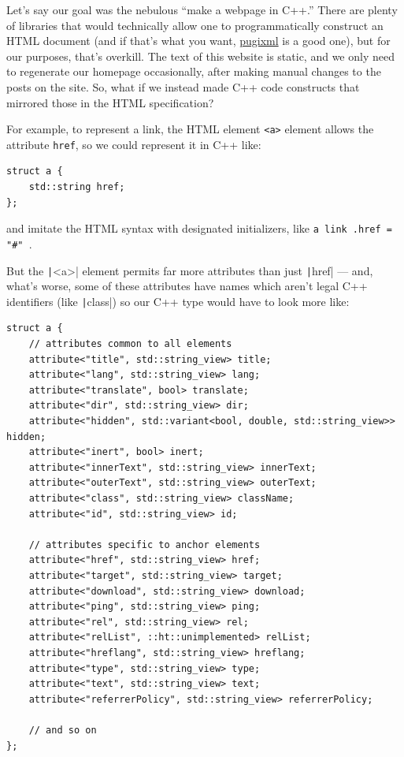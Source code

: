 \documentclass[10pt]{article}
\begin{document}
Let's say our goal was the nebulous ``make a webpage in C++.'' There are plenty of libraries that would technically allow one to programmatically construct an HTML document (and if that's what you want, \href{https://github.com/zeux/pugixml}{pugixml} is a good one), but for our purposes, that's overkill. The text of this website is static, and we only need to regenerate our homepage occasionally, after making manual changes to the posts on the site. So, what if we instead made C++ code constructs that mirrored those in the HTML specification? 

For example, to represent a link, the HTML element \verb|<a>| element allows the attribute \verb|href|, so we could represent it in C++ like: 
\begin{verbatim}
struct a {
    std::string href;
};
\end{verbatim}
and imitate the HTML syntax with designated initializers, like \texttt{a link{ .href = "#" }}. 

But the \texttt|<a>| element permits far more attributes than just \texttt|href| --- and, what's worse, some of these attributes have names which aren't legal C++ identifiers (like \texttt|class|) so our C++ type would have to look more like:
\begin{verbatim}
struct a {
    // attributes common to all elements
    attribute<"title", std::string_view> title;
    attribute<"lang", std::string_view> lang;
    attribute<"translate", bool> translate;
    attribute<"dir", std::string_view> dir;
    attribute<"hidden", std::variant<bool, double, std::string_view>> hidden;
    attribute<"inert", bool> inert;
    attribute<"innerText", std::string_view> innerText;
    attribute<"outerText", std::string_view> outerText;
    attribute<"class", std::string_view> className;
    attribute<"id", std::string_view> id;

    // attributes specific to anchor elements
    attribute<"href", std::string_view> href;
    attribute<"target", std::string_view> target;
    attribute<"download", std::string_view> download;
    attribute<"ping", std::string_view> ping;
    attribute<"rel", std::string_view> rel;
    attribute<"relList", ::ht::unimplemented> relList;
    attribute<"hreflang", std::string_view> hreflang;
    attribute<"type", std::string_view> type;
    attribute<"text", std::string_view> text;
    attribute<"referrerPolicy", std::string_view> referrerPolicy;

    // and so on
};
\end{verbatim}
\end{document}

